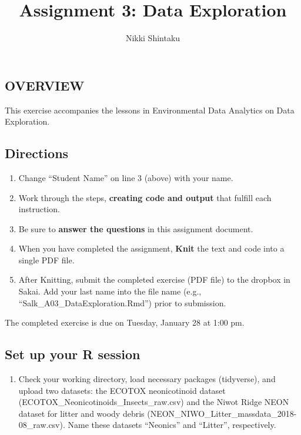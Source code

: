 \documentclass[]{article}
\title{Assignment 3: Data Exploration}
\author{Nikki Shintaku}
\date{}
\providecommand{\tightlist}{%
  \setlength{\itemsep}{0pt}\setlength{\parskip}{0pt}}
\begin{document}
\maketitle

\hypertarget{overview}{%
\subsection{OVERVIEW}\label{overview}}

This exercise accompanies the lessons in Environmental Data Analytics on
Data Exploration.

\hypertarget{directions}{%
\subsection{Directions}\label{directions}}

\begin{enumerate}
\def\labelenumi{\arabic{enumi}.}
\tightlist
\item
  Change ``Student Name'' on line 3 (above) with your name.
\item
  Work through the steps, \textbf{creating code and output} that fulfill
  each instruction.
\item
  Be sure to \textbf{answer the questions} in this assignment document.
\item
  When you have completed the assignment, \textbf{Knit} the text and
  code into a single PDF file.
\item
  After Knitting, submit the completed exercise (PDF file) to the
  dropbox in Sakai. Add your last name into the file name (e.g.,
  ``Salk\_A03\_DataExploration.Rmd'') prior to submission.
\end{enumerate}

The completed exercise is due on Tuesday, January 28 at 1:00 pm.

\hypertarget{set-up-your-r-session}{%
\subsection{Set up your R session}\label{set-up-your-r-session}}

\begin{enumerate}
\def\labelenumi{\arabic{enumi}.}
\tightlist
\item
  Check your working directory, load necessary packages (tidyverse), and
  upload two datasets: the ECOTOX neonicotinoid dataset
  (ECOTOX\_Neonicotinoids\_Insects\_raw.csv) and the Niwot Ridge NEON
  dataset for litter and woody debris
  (NEON\_NIWO\_Litter\_massdata\_2018-08\_raw.csv). Name these datasets
  ``Neonics'' and ``Litter'', respectively.
\end{enumerate}
\end{document}
